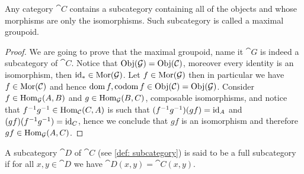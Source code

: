 \begin{lemma}
  Any category \(\cat C\) contains a subcategory containing all of the objects
  and whose morphisms are only the isomorphisms. Such subcategory is called a
  maximal groupoid.
\end{lemma}

\begin{proof}
  We are going to prove that the maximal groupoid, name it \(\cat G\) is indeed
  a subcategory of \(\cat C\). Notice that \(\operatorname{Obj}(\mathcal G) = \operatorname{Obj}(\mathcal C)\),
  moreover every identity is an isomorphism, then \(\operatorname{id}_{*} \in \operatorname{Mor}(\mathcal G)\).
  Let \(f \in \operatorname{Mor}(\mathcal G)\) then in particular we have \(f \in \operatorname{Mor}(\mathcal C)\)
  and hence \(\operatorname{dom} f, \operatorname{codom} f \in \operatorname{Obj}(\mathcal C) =
  \operatorname{Obj}(\mathcal G)\). Consider \(f \in \operatorname{Hom}_{\mathcal G}(A, B)\) and \(g \in \operatorname{Hom}_{\mathcal
  G}(B, C)\), composable isomorphisms, and notice that \(f^{-1}  g^{-1}
  \in \operatorname{Hom}_{\mathcal C}(C, A)\) is such that \((f^{-1}  g^{-1})  (g
  f) = \operatorname{id}_A\) and \((g  f)  (f^{-1}  g^{-1}) = \operatorname{id}_C\), hence we
  conclude that \(g  f\) is an isomorphism and therefore \(g  f \in
  \operatorname{Hom}_{\mathcal G}(A, C)\).
\end{proof}

\begin{definition}\label{def: full subcategory}
  A subcategory \(\cat D\) of \(\cat C\) (see \cref{def: subcategory}) is said
  to be a full subcategory if for all \(x, y \in \cat D\) we have \(\cat D(x, y)
  = \cat C(x, y)\).
\end{definition}


